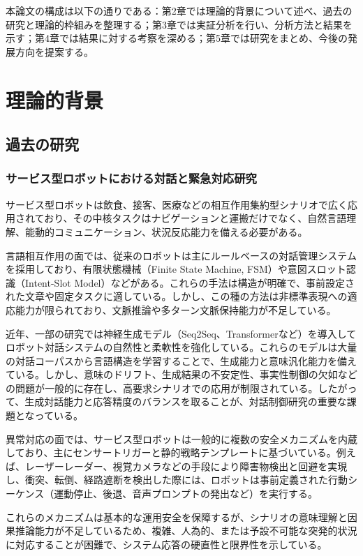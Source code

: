 \documentclass[12pt]{report}
\begin{document}
本論文の構成は以下の通りである：第2章では理論的背景について述べ、過去の研究と理論的枠組みを整理する；第3章では実証分析を行い、分析方法と結果を示す；第4章では結果に対する考察を深める；第5章では研究をまとめ、今後の発展方向を提案する。

\chapter{理論的背景}
\label{chap:background}

\section{過去の研究}
\label{sec:previous_work}

\subsection{サービス型ロボットにおける対話と緊急対応研究}

サービス型ロボットは飲食、接客、医療などの相互作用集約型シナリオで広く応用されており、その中核タスクはナビゲーションと運搬だけでなく、自然言語理解、能動的コミュニケーション、状況反応能力を備える必要がある。

言語相互作用の面では、従来のロボットは主にルールベースの対話管理システムを採用しており、有限状態機械（Finite State Machine, FSM）や意図スロット認識（Intent-Slot Model）などがある。これらの手法は構造が明確で、事前設定された文章や固定タスクに適している。しかし、この種の方法は非標準表現への適応能力が限られており、文脈推論や多ターン文脈保持能力が不足している。

近年、一部の研究では神経生成モデル（Seq2Seq、Transformerなど）を導入してロボット対話システムの自然性と柔軟性を強化している。これらのモデルは大量の対話コーパスから言語構造を学習することで、生成能力と意味汎化能力を備えている。しかし、意味のドリフト、生成結果の不安定性、事実性制御の欠如などの問題が一般的に存在し、高要求シナリオでの応用が制限されている。したがって、生成対話能力と応答精度のバランスを取ることが、対話制御研究の重要な課題となっている。

異常対応の面では、サービス型ロボットは一般的に複数の安全メカニズムを内蔵しており、主にセンサートリガーと静的戦略テンプレートに基づいている。例えば、レーザーレーダー、視覚カメラなどの手段により障害物検出と回避を実現し、衝突、転倒、経路遮断を検出した際には、ロボットは事前定義された行動シーケンス（運動停止、後退、音声プロンプトの発出など）を実行する。

これらのメカニズムは基本的な運用安全を保障するが、シナリオの意味理解と因果推論能力が不足しているため、複雑、人為的、または予設不可能な突発的状況に対応することが困難で、システム応答の硬直性と限界性を示している。
\end{document}
